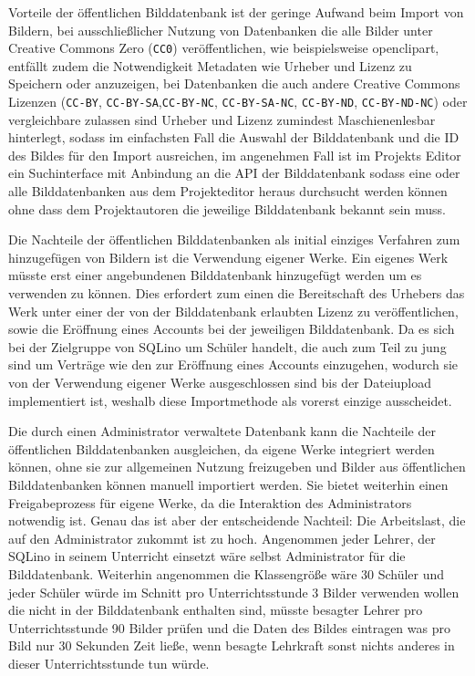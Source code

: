 Vorteile der öffentlichen
Bilddatenbank ist der geringe Aufwand beim Import von Bildern, bei
ausschließlicher Nutzung von Datenbanken die alle Bilder unter
Creative Commons Zero (\texttt{CC0}) veröffentlichen, wie beispielsweise
openclipart, entfällt zudem die Notwendigkeit Metadaten wie Urheber
und Lizenz zu Speichern oder anzuzeigen, bei Datenbanken die auch
andere Creative Commons Lizenzen (\texttt{CC-BY}, \texttt{CC-BY-SA},\texttt{CC-BY-NC},
\texttt{CC-BY-SA-NC}, \texttt{CC-BY-ND}, \texttt{CC-BY-ND-NC}) oder
vergleichbare zulassen sind Urheber und Lizenz zumindest Maschienenlesbar
hinterlegt, sodass im einfachsten Fall die Auswahl der Bilddatenbank und die ID
des Bildes für den Import ausreichen, im angenehmen Fall ist im Projekts Editor
ein Suchinterface mit Anbindung an die API der Bilddatenbank sodass
eine oder alle Bilddatenbanken aus dem Projekteditor heraus durchsucht
werden können ohne dass dem Projektautoren die jeweilige Bilddatenbank
bekannt sein muss.

Die Nachteile der öffentlichen Bilddatenbanken als initial einziges Verfahren
zum hinzugefügen von Bildern ist die Verwendung eigener Werke. Ein eigenes Werk
müsste erst einer angebundenen Bilddatenbank hinzugefügt werden um es verwenden
zu können. Dies erfordert zum einen die Bereitschaft des Urhebers das Werk unter
einer der von der Bilddatenbank erlaubten Lizenz zu veröffentlichen, sowie die
Eröffnung eines Accounts bei der jeweiligen Bilddatenbank. Da es sich bei der
Zielgruppe von SQLino um Schüler handelt, die auch zum Teil zu jung sind um
Verträge wie den zur Eröffnung eines Accounts einzugehen, wodurch sie von der
Verwendung eigener Werke ausgeschlossen sind bis der Dateiupload implementiert
ist, weshalb diese Importmethode als vorerst einzige ausscheidet.

Die durch einen Administrator verwaltete Datenbank kann die Nachteile der
öffentlichen Bilddatenbanken ausgleichen, da eigene Werke integriert werden
können, ohne sie zur allgemeinen Nutzung freizugeben und Bilder aus
öffentlichen Bilddatenbanken können manuell importiert werden. Sie bietet
weiterhin einen Freigabeprozess für eigene Werke, da die Interaktion des
Administrators notwendig ist. Genau das ist aber der entscheidende Nachteil: Die
Arbeitslast, die auf den Administrator zukommt ist zu hoch. Angenommen jeder
Lehrer, der SQLino in seinem Unterricht einsetzt wäre selbst Administrator für
die Bilddatenbank. Weiterhin angenommen die Klassengröße wäre 30 Schüler und
jeder Schüler würde im Schnitt pro Unterrichtsstunde 3 Bilder verwenden wollen
die nicht in der Bilddatenbank enthalten sind, müsste besagter Lehrer pro
Unterrichtsstunde 90 Bilder prüfen und die Daten des Bildes eintragen was pro
Bild nur 30 Sekunden Zeit ließe, wenn besagte Lehrkraft sonst nichts anderes in
dieser Unterrichtsstunde tun würde.

